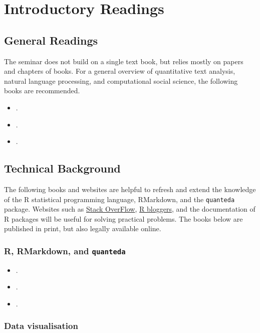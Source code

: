 \documentclass[abstract=on,parskip=full,headings=standardclasses,fontsize=11pt,paper=a4]{scrartcl}
\begin{document}
\section*{Introductory Readings}

\subsection*{General Readings}

The seminar does not build on a single text book, but relies mostly on papers and chapters of books. For  a general overview of quantitative text analysis, natural language processing, and computational social science, the following books are recommended.

\begin{itemize}
\item {}.
\item {}.
\item {}.
\end{itemize}


\subsection*{Technical Background}

The following books and websites are helpful to refresh and extend the knowledge of the \textsf{R} statistical programming language, RMarkdown, and the \texttt{quanteda} package.  Websites such as \href{https://stackoverflow.com/}{Stack OverFlow}, \href{https://www.r-bloggers.com}{R bloggers}, and the documentation of \textsf{R} packages will be useful for solving practical problems. The books below are published in print, but also legally available online.

\subsubsection*{\textsf{R}, RMarkdown, and \texttt{quanteda}}
\begin{itemize}
\item {}.
\item {}.
\item {}.
\end{itemize}

\subsubsection*{Data visualisation}
\end{document}
